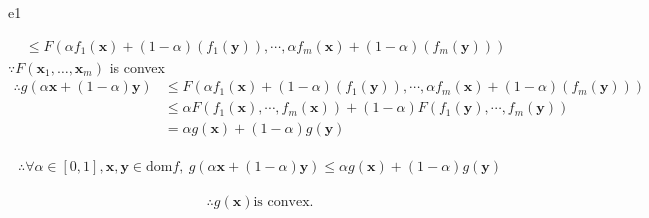 \documentclass{article}
\newcommand{\xB}{\bm{x}}
\newcommand{\yB}{\bm{y}}
\begin{document}
\begin{PROOF}{e1}
\begin{enumerate}
\begin{align}
						&\le F(\alpha f_1(\xB)+(1-\alpha)(f_1(\yB)),\cdots,\alpha f_m(\xB)+(1-\alpha)(f_m(\yB)))
			\end{align}
		​    $\because F(\xB_1, \ldots, \xB_m)$ is convex
		​    \begin{align}
		​      \therefore g(\alpha \xB+(1-\alpha) \yB)&\le F(\alpha f_1(\xB)+(1-\alpha)(f_1(\yB)),\cdots,\alpha f_m(\xB)+(1-\alpha)(f_m(\yB)))\\
​      			&\le \alpha F(f_1(\xB),\cdots,f_m(\xB))+(1-\alpha)F(f_1(\yB),\cdots,f_m(\yB))\\
				&=\alpha g(\xB)+(1-\alpha)g(\yB)
		​    \end{align}
		​    \[ 
		​      \therefore \forall \alpha \in [0,1],\xB ,\yB \in \text{dom} f,\ 
		​      g(\alpha \xB+(1-\alpha) \yB)\le \alpha g(\xB)+(1-\alpha)g(\yB)
		​    \]
		​    \[
				\therefore g(\xB) \text{is convex.}
			\]
	\end{enumerate}

\end{PROOF}
\end{document}
